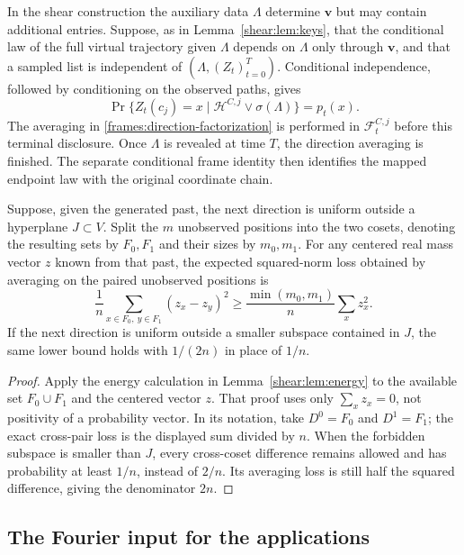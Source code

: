 In the shear construction the auxiliary data $\Lambda$ determine
$\mathbf v$ but may contain additional entries. Suppose, as in
Lemma~\ref{shear:lem:keys}, that the conditional law of the full virtual
trajectory given $\Lambda$ depends on $\Lambda$ only through
$\mathbf v$, and that a sampled list is independent of
$(\Lambda,(Z_t)_{t=0}^T)$. Conditional independence, followed by
conditioning on the observed paths, gives
\begin{equation}
 \Pr\{Z_t(c_j)=x\mid
       \mathcal H^{C,j}\vee\sigma(\Lambda)\}=p_t(x).
 \label{frames:terminal-disclosure}
\end{equation}
The averaging in \eqref{frames:direction-factorization} is performed
in $\mathcal F_t^{C,j}$ before this terminal disclosure. Once
$\Lambda$ is revealed at time $T$, the direction averaging is finished.
The separate conditional frame identity then identifies the mapped
endpoint law with the original coordinate chain.

\begin{lemma}
\label{frames:cross-energy}
Suppose, given the generated past, the next direction is uniform outside
a hyperplane $J\subset V$. Split the $m$ unobserved positions into the
two cosets, denoting the resulting sets by $F_0,F_1$ and their sizes
by $m_0,m_1$. For any centered real mass vector $z$
known from that past, the expected squared-norm loss obtained by
averaging on the paired unobserved positions is
\[
 \frac1n\sum_{x\in F_0,\ y\in F_1}(z_x-z_y)^2
 \ge \frac{\min(m_0,m_1)}n\sum_xz_x^2.
\]
If the next direction is uniform outside a smaller subspace contained
in $J$, the same lower bound holds with $1/(2n)$ in place of $1/n$.
\end{lemma}

\begin{proof}
Apply the energy calculation in Lemma~\ref{shear:lem:energy} to the
available set $F_0\cup F_1$ and the centered vector $z$. That proof
uses only $\sum_xz_x=0$, not positivity of a probability vector.
In its notation, take $D^0=F_0$ and $D^1=F_1$; the exact
cross-pair loss is the displayed sum divided by $n$.
When the forbidden subspace is smaller than $J$, every cross-coset
difference remains allowed and has probability at least $1/n$,
instead of $2/n$. Its averaging loss is still half the squared
difference, giving the denominator $2n$.
\end{proof}

\subsection{The Fourier input for the applications}
\label{frames:degree-section}

